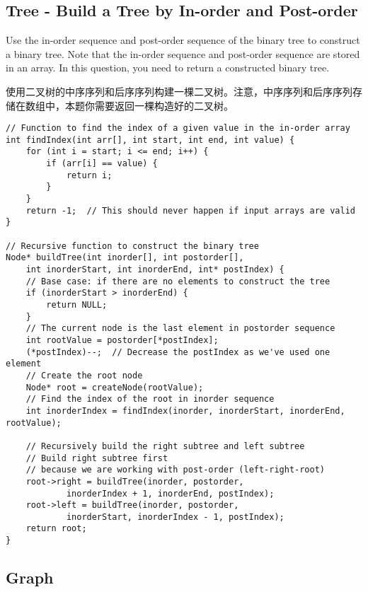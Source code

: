 \documentclass[a4paper]{article}
\begin{document}
\newpage

\subsection{Tree - Build a Tree by In-order and Post-order}

Use the in-order sequence and post-order sequence of the binary tree to construct a binary tree. Note that the in-order sequence and post-order sequence are stored in an array. In this question, you need to return a constructed binary tree.

使用二叉树的中序序列和后序序列构建一棵二叉树。注意，中序序列和后序序列存储在数组中，本题你需要返回一棵构造好的二叉树。

\begin{verbatim}
// Function to find the index of a given value in the in-order array
int findIndex(int arr[], int start, int end, int value) {
    for (int i = start; i <= end; i++) {
        if (arr[i] == value) {
            return i;
        }
    }
    return -1;  // This should never happen if input arrays are valid
}

// Recursive function to construct the binary tree
Node* buildTree(int inorder[], int postorder[],
	int inorderStart, int inorderEnd, int* postIndex) {
    // Base case: if there are no elements to construct the tree
    if (inorderStart > inorderEnd) {
        return NULL;
    }
    // The current node is the last element in postorder sequence
    int rootValue = postorder[*postIndex];
    (*postIndex)--;  // Decrease the postIndex as we've used one element
    // Create the root node
    Node* root = createNode(rootValue);
    // Find the index of the root in inorder sequence
    int inorderIndex = findIndex(inorder, inorderStart, inorderEnd, rootValue);

    // Recursively build the right subtree and left subtree
    // Build right subtree first
    // because we are working with post-order (left-right-root)
    root->right = buildTree(inorder, postorder,
    		inorderIndex + 1, inorderEnd, postIndex);
    root->left = buildTree(inorder, postorder,
    		inorderStart, inorderIndex - 1, postIndex);
    return root;
}
\end{verbatim}

\newpage

\subsection{Graph}
\end{document}
